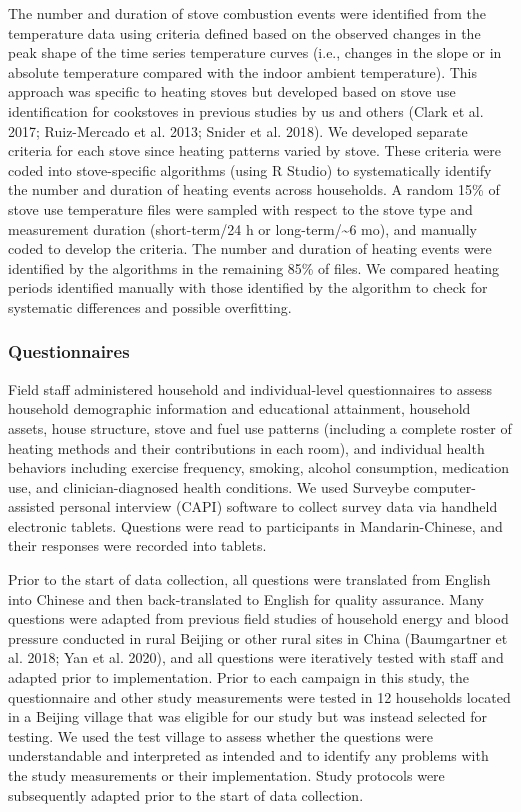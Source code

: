 \documentclass[
  letterpaper,
  DIV=11,
  numbers=noendperiod]{scrartcl}
\begin{document}
The number and duration of stove combustion events were identified from
the temperature data using criteria defined based on the observed
changes in the peak shape of the time series temperature curves (i.e.,
changes in the slope or in absolute temperature compared with the indoor
ambient temperature). This approach was specific to heating stoves but
developed based on stove use identification for cookstoves in previous
studies by us and others (Clark et al. 2017; Ruiz-Mercado et al. 2013;
Snider et al. 2018). We developed separate criteria for each stove since
heating patterns varied by stove. These criteria were coded into
stove-specific algorithms (using R Studio) to systematically identify
the number and duration of heating events across households. A random
15\% of stove use temperature files were sampled with respect to the
stove type and measurement duration (short-term/24 h or
long-term/\textasciitilde6 mo), and manually coded to develop the
criteria. The number and duration of heating events were identified by
the algorithms in the remaining 85\% of files. We compared heating
periods identified manually with those identified by the algorithm to
check for systematic differences and possible overfitting.

\hypertarget{questionnaires}{%
\subsubsection{Questionnaires}\label{questionnaires}}

Field staff administered household and individual-level questionnaires
to assess household demographic information and educational attainment,
household assets, house structure, stove and fuel use patterns
(including a complete roster of heating methods and their contributions
in each room), and individual health behaviors including exercise
frequency, smoking, alcohol consumption, medication use, and
clinician-diagnosed health conditions. We used Surveybe
computer-assisted personal interview (CAPI) software to collect survey
data via handheld electronic tablets. Questions were read to
participants in Mandarin-Chinese, and their responses were recorded into
tablets.

Prior to the start of data collection, all questions were translated
from English into Chinese and then back-translated to English for
quality assurance. Many questions were adapted from previous field
studies of household energy and blood pressure conducted in rural
Beijing or other rural sites in China (Baumgartner et al. 2018; Yan et
al. 2020), and all questions were iteratively tested with staff and
adapted prior to implementation. Prior to each campaign in this study,
the questionnaire and other study measurements were tested in 12
households located in a Beijing village that was eligible for our study
but was instead selected for testing. We used the test village to assess
whether the questions were understandable and interpreted as intended
and to identify any problems with the study measurements or their
implementation. Study protocols were subsequently adapted prior to the
start of data collection.
\end{document}
